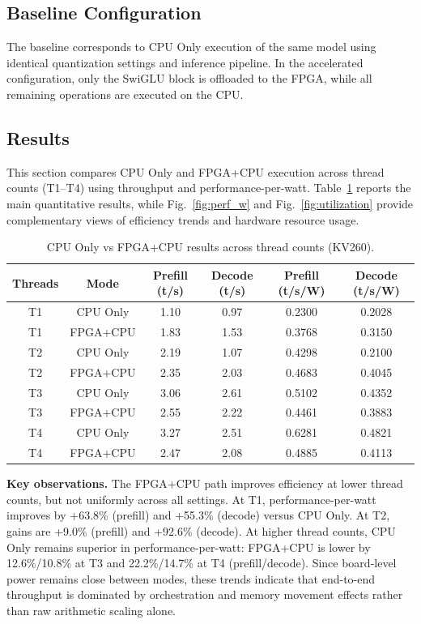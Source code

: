 \documentclass[conference]{IEEEtran}
\begin{document}
\subsection{Baseline Configuration}

The baseline corresponds to CPU Only execution of the same model using identical quantization settings and inference pipeline. In the accelerated configuration, only the SwiGLU block is offloaded to the FPGA, while all remaining operations are executed on the CPU.

\subsection{Results}

This section compares CPU Only and FPGA+CPU execution across thread counts (T1--T4) using throughput and performance-per-watt. Table~\ref{tab:results} reports the main quantitative results, while Fig.~\ref{fig:perf_w} and Fig.~\ref{fig:utilization} provide complementary views of efficiency trends and hardware resource usage.

\begin{table}[h]
\centering
\scriptsize
\caption{CPU Only vs FPGA+CPU results across thread counts (KV260).}
\label{tab:results}
\setlength{\tabcolsep}{3pt}
\begin{tabular}{c c c c c c}
\hline
Threads & Mode & Prefill (t/s) & Decode (t/s) & Prefill (t/s/W) & Decode (t/s/W) \\
\hline
T1 & CPU Only & 1.10 & 0.97 & 0.2300 & 0.2028 \\
T1 & FPGA+CPU & 1.83 & 1.53 & 0.3768 & 0.3150 \\
\hline
T2 & CPU Only & 2.19 & 1.07 & 0.4298 & 0.2100 \\
T2 & FPGA+CPU & 2.35 & 2.03 & 0.4683 & 0.4045 \\
\hline
T3 & CPU Only & 3.06 & 2.61 & 0.5102 & 0.4352 \\
T3 & FPGA+CPU & 2.55 & 2.22 & 0.4461 & 0.3883 \\
\hline
T4 & CPU Only & 3.27 & 2.51 & 0.6281 & 0.4821 \\
T4 & FPGA+CPU & 2.47 & 2.08 & 0.4885 & 0.4113 \\
\hline
\end{tabular}
\end{table}
\textbf{Key observations.} The FPGA+CPU path improves efficiency at lower thread counts, but not uniformly across all settings. At T1, performance-per-watt improves by +63.8\% (prefill) and +55.3\% (decode) versus CPU Only. At T2, gains are +9.0\% (prefill) and +92.6\% (decode). At higher thread counts, CPU Only remains superior in performance-per-watt: FPGA+CPU is lower by 12.6\%/10.8\% at T3 and 22.2\%/14.7\% at T4 (prefill/decode). Since board-level power remains close between modes, these trends indicate that end-to-end throughput is dominated by orchestration and memory movement effects rather than raw arithmetic scaling alone.
\end{document}
